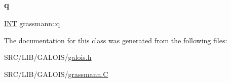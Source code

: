 \mbox{\label{classgrassmann_ad5dff52fd51c013782b3b128f0f1f965}} 
\subsubsection{\texorpdfstring{q}{q}}
{\footnotesize\ttfamily \mbox{\hyperlink{galois_8h_a09fddde158a3a20bd2dcadb609de11dc}{I\+NT}} grassmann\+::q}



The documentation for this class was generated from the following files\+:\begin{DoxyCompactItemize}
\item 
S\+R\+C/\+L\+I\+B/\+G\+A\+L\+O\+I\+S/\mbox{\hyperlink{galois_8h}{galois.\+h}}\item 
S\+R\+C/\+L\+I\+B/\+G\+A\+L\+O\+I\+S/\mbox{\hyperlink{_l_i_b_2_g_a_l_o_i_s_2grassmann_8_c}{grassmann.\+C}}\end{DoxyCompactItemize}
